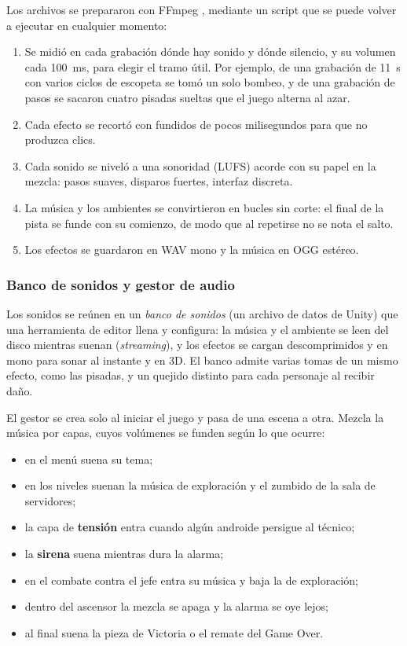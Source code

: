 Los archivos se prepararon con FFmpeg \parencite{ffmpeg2026}, mediante un script que se puede
volver a ejecutar en cualquier momento:

\begin{enumerate}
  \item Se midió en cada grabación dónde hay sonido y dónde silencio, y su volumen cada 100~ms,
        para elegir el tramo útil. Por ejemplo, de una grabación de 11~s con varios ciclos de
        escopeta se tomó un solo bombeo, y de una grabación de pasos se sacaron cuatro pisadas
        sueltas que el juego alterna al azar.
  \item Cada efecto se recortó con fundidos de pocos milisegundos para que no produzca clics.
  \item Cada sonido se niveló a una sonoridad (LUFS) acorde con su papel en la mezcla: pasos
        suaves, disparos fuertes, interfaz discreta.
  \item La música y los ambientes se convirtieron en bucles sin corte: el final de la pista se
        funde con su comienzo, de modo que al repetirse no se nota el salto.
  \item Los efectos se guardaron en WAV mono y la música en OGG estéreo.
\end{enumerate}


\subsubsection{Banco de sonidos y gestor de audio}

Los sonidos se reúnen en un \textit{banco de sonidos} (un archivo de datos de Unity) que una
herramienta de editor llena y configura: la música y el ambiente se leen del disco mientras suenan
(\textit{streaming}), y los efectos se cargan descomprimidos y en mono para sonar al instante y en
3D. El banco admite varias tomas de un mismo efecto, como las pisadas, y un quejido distinto para
cada personaje al recibir daño.

El gestor  se crea solo al iniciar el juego y pasa de una escena a otra. Mezcla la
música por capas, cuyos volúmenes se funden según lo que ocurre:

\begin{itemize}
  \item en el menú suena su tema;
  \item en los niveles suenan la música de exploración y el zumbido de la sala de servidores;
  \item la capa de \textbf{tensión} entra cuando algún androide persigue al técnico;
  \item la \textbf{sirena} suena mientras dura la alarma;
  \item en el combate contra el jefe entra su música y baja la de exploración;
  \item dentro del ascensor la mezcla se apaga y la alarma se oye lejos;
  \item al final suena la pieza de Victoria o el remate del Game Over.
\end{itemize}

